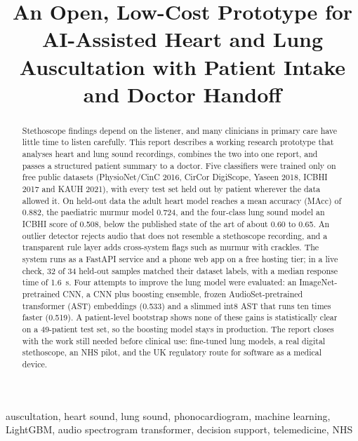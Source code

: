 \documentclass[conference]{IEEEtran}
\begin{document}
\title{An Open, Low-Cost Prototype for AI-Assisted Heart and Lung Auscultation with Patient Intake and Doctor Handoff}

\author{
}

\maketitle

\begin{abstract}
Stethoscope findings depend on the listener, and many clinicians in primary care have little time to listen carefully. This report describes a working research prototype that analyses heart and lung sound recordings, combines the two into one report, and passes a structured patient summary to a doctor. Five classifiers were trained only on free public datasets (PhysioNet/CinC 2016, CirCor DigiScope, Yaseen 2018, ICBHI 2017 and KAUH 2021), with every test set held out by patient wherever the data allowed it. On held-out data the adult heart model reaches a mean accuracy (MAcc) of 0.882, the paediatric murmur model 0.724, and the four-class lung sound model an ICBHI score of 0.508, below the published state of the art of about 0.60 to 0.65. An outlier detector rejects audio that does not resemble a stethoscope recording, and a transparent rule layer adds cross-system flags such as murmur with crackles. The system runs as a FastAPI service and a phone web app on a free hosting tier; in a live check, 32 of 34 held-out samples matched their dataset labels, with a median response time of 1.6~s. Four attempts to improve the lung model were evaluated: an ImageNet-pretrained CNN, a CNN plus boosting ensemble, frozen AudioSet-pretrained transformer (AST) embeddings (0.533) and a slimmed int8 AST that runs ten times faster (0.519). A patient-level bootstrap shows none of these gains is statistically clear on a 49-patient test set, so the boosting model stays in production. The report closes with the work still needed before clinical use: fine-tuned lung models, a real digital stethoscope, an NHS pilot, and the UK regulatory route for software as a medical device.
\end{abstract}

\begin{IEEEkeywords}
auscultation, heart sound, lung sound, phonocardiogram, machine learning, LightGBM, audio spectrogram transformer, decision support, telemedicine, NHS
\end{IEEEkeywords}
\end{document}
